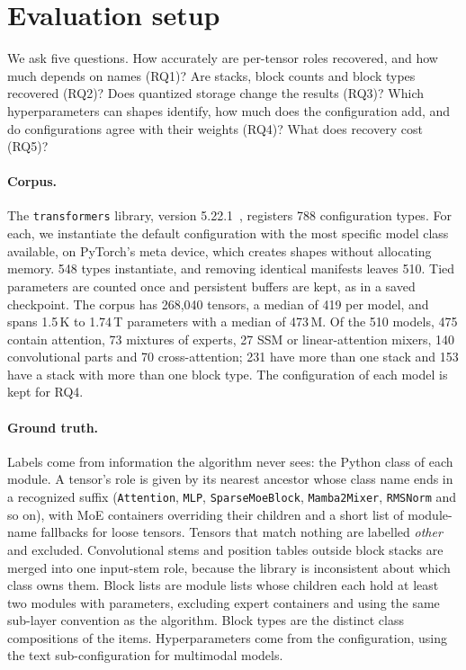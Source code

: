 \documentclass[11pt]{article}
\newcommand{\tn}[1]{\texttt{#1}}
\begin{document}
\section{Evaluation setup}
\label{sec:setup}

We ask five questions. How accurately are per-tensor roles recovered, and how much depends on names (RQ1)? Are stacks, block counts and block types recovered (RQ2)? Does quantized storage change the results (RQ3)? Which hyperparameters can shapes identify, how much does the configuration add, and do configurations agree with their weights (RQ4)? What does recovery cost (RQ5)? \RBsetupQ{}

\paragraph{Corpus.} The \tn{transformers} library, version 5.22.1~\citep{wolf2020transformers}, registers 788 configuration types. For each, we instantiate the default configuration with the most specific model class available, on PyTorch's meta device, which creates shapes without allocating memory. 548 types instantiate, and removing identical manifests leaves 510. Tied parameters are counted once and persistent buffers are kept, as in a saved checkpoint. The corpus has 268{,}040 tensors, a median of 419 per model, and spans 1.5\,K to 1.74\,T parameters with a median of 473\,M. Of the 510 models, 475 contain attention, 73 mixtures of experts, 27 SSM or linear-attention mixers, 140 convolutional parts and 70 cross-attention; 231 have more than one stack and 153 have a stack with more than one block type. The configuration of each model is kept for RQ4.

\paragraph{Ground truth.} Labels come from information the algorithm never sees: the Python class of each module. A tensor's role is given by its nearest ancestor whose class name ends in a recognized suffix (\tn{Attention}, \tn{MLP}, \tn{SparseMoeBlock}, \tn{Mamba2Mixer}, \tn{RMSNorm} and so on), with MoE containers overriding their children and a short list of module-name fallbacks for loose tensors. Tensors that match nothing are labelled \emph{other} and excluded. Convolutional stems and position tables outside block stacks are merged into one input-stem role, because the library is inconsistent about which class owns them. Block lists are module lists whose children each hold at least two modules with parameters, excluding expert containers and using the same sub-layer convention as the algorithm. Block types are the distinct class compositions of the items. Hyperparameters come from the configuration, using the text sub-configuration for multimodal models.
\end{document}
